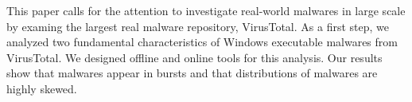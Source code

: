 This paper calls for the attention to investigate real-world malwares in large scale
by examing the largest real malware repository, VirusTotal.
As a first step, we analyzed two fundamental characteristics of Windows executable malwares from VirusTotal. 
We designed offline and online tools for this analysis.
Our results show that malwares appear in bursts and that distributions of malwares are highly skewed. 
